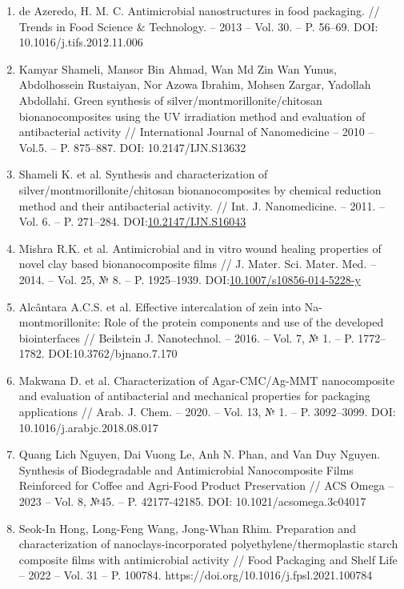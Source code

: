 \begin{enumerate}
\item
  de Azeredo, H. M. C. Antimicrobial nanostructures in food packaging.
  // Trends in Food Science \& Technology. -- 2013 -- Vol. 30. -- P.
  56--69. DOI: 10.1016/j.tifs.2012.11.006
\item
  Kamyar Shameli, Mansor Bin Ahmad, Wan Md Zin Wan Yunus, Abdolhossein
  Rustaiyan, Nor Azowa Ibrahim, Mohsen Zargar, Yadollah Abdollahi. Green
  synthesis of silver/montmorillonite/chitosan bionanocomposites using
  the UV irradiation method and evaluation of antibacterial activity //
  International Journal of Nanomedicine -- 2010 -- Vol.5. -- P.
  875--887. DOI: 10.2147/IJN.S13632
\item
  Shameli K. et al. Synthesis and characterization of
  silver/montmorillonite/chitosan bionanocomposites by chemical
  reduction method and their antibacterial activity. // Int. J.
  Nanomedicine. -- 2011. -- Vol. 6. -- P. 271--284.
  DOI:\href{http://dx.doi.org/10.2147/IJN.S16043}{10.2147/IJN.S16043}
\item
  Mishra R.K. et al. Antimicrobial and in vitro wound healing properties
  of novel clay based bionanocomposite films // J. Mater. Sci. Mater.
  Med. -- 2014. -- Vol. 25, № 8. -- P. 1925--1939.
  DOI:\href{http://dx.doi.org/10.1007/s10856-014-5228-y}{10.1007/s10856-014-5228-y}
\item
  Alcântara A.C.S. et al. Effective intercalation of zein into
  Na-montmorillonite: Role of the protein components and use of the
  developed biointerfaces // Beilstein J. Nanotechnol. -- 2016. -- Vol.
  7, № 1. -- P. 1772--1782. DOI:10.3762/bjnano.7.170
\item
  Makwana D. et al. Characterization of Agar-CMC/Ag-MMT nanocomposite
  and evaluation of antibacterial and mechanical properties for
  packaging applications // Arab. J. Chem. -- 2020. -- Vol. 13, № 1. --
  P. 3092--3099. DOI: 10.1016/j.arabjc.2018.08.017
\item
  Quang Lich Nguyen, Dai Vuong Le, Anh N. Phan, and Van Duy Nguyen.
  Synthesis of Biodegradable and Antimicrobial Nanocomposite Films
  Reinforced for Coffee and Agri-Food Product Preservation // ACS Omega
  -- 2023 -- Vol. 8, №45. -- P. 42177-42185. DOI:
  10.1021/acsomega.3c04017
\item
  Seok-In Hong, Long-Feng Wang, Jong-Whan Rhim. Preparation and
  characterization of nanoclays-incorporated polyethylene/thermoplastic
  starch composite films with antimicrobial activity // Food Packaging
  and Shelf Life -- 2022 -- Vol. 31 -- P. 100784.
  https://doi.org/10.1016/j.fpsl.2021.100784

\end{enumerate}
